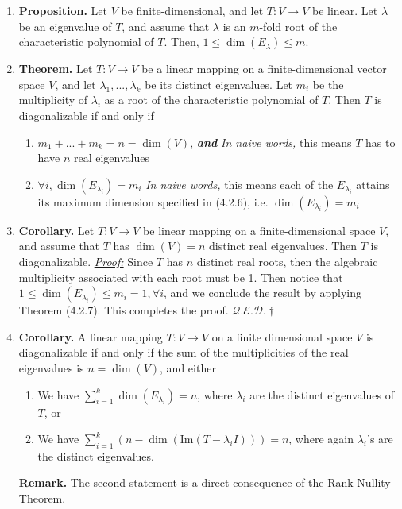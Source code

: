 \documentclass[oneside, 12pt]{book}
\newcommand{\settag}[1]{\renewcommand{\theenumi}{#1}}
\newcommand{\qed}{\hfill $\mathcal{Q}.\mathcal{E}.\mathcal{D}.\dagger$}
\newcommand{\tbf}[1]{\textbf{#1}}
\newcommand{\tit}[1]{\textit{#1}}
\newcommand{\proof}{\tit{\underline{Proof:}}} %
\newcommand{\trans}[3]{$#1:#2\rightarrow{}#3$}
\newcommand{\para}[1]{\item \tbf{#1}}
\begin{document}
\begin{enumerate}
    \settag{4.2.6}
    \para{Proposition.} Let $V$ be finite-dimensional, and let \trans{T}{V}{V} be linear. Let $\lambda$ be an eigenvalue of $T$, and assume that $\lambda$ is an $m$-fold root of the characteristic polynomial of $T$. Then, $1\leq \dim(E_\lambda) \leq m$.
    
    \settag{4.2.7}
    \para{Theorem.} Let \trans{T}{V}{V} be a linear mapping on a finite-dimensional vector space $V$, and let $\lambda_1,...,\lambda_k$ be its distinct eigenvalues. Let $m_i$ be the multiplicity of $\lambda_i$ as a root of the characteristic polynomial of $T$. Then $T$ is diagonalizable if and only if
    \begin{enumerate}
        \item $m_1+...+m_k = n = \dim(V)$, \tit{\tbf{and}} \newline
        \tit{In naive words, }this means $T$ has to have $n$ real eigenvalues
        \item $\forall i, \dim(E_{\lambda_i}) = m_i$ \newline
        \tit{In naive words, }this means each of the $E_{\lambda_i}$ attains its maximum dimension specified in (4.2.6), i.e. $\dim(E_{\lambda_i}) = m_i$
    \end{enumerate}
    
    \settag{4.2.8}
    \para{Corollary.} Let \trans{T}{V}{V} be linear mapping on a finite-dimensional space $V$, and assume that $T$ has $\dim(V) = n$ distinct real eigenvalues. Then $T$ is diagonalizable. \newline
    \proof \newline
    Since $T$ has $n$ distinct real roots, then the algebraic multiplicity associated with each root must be 1. Then notice that $1\leq \dim(E_{\lambda_i}) \leq m_i = 1, \forall i$, and we conclude the result by applying Theorem (4.2.7). This completes the proof. \qed
    
    \settag{4.2.9}
    \para{Corollary.} A linear mapping \trans{T}{V}{V} on a finite dimensional space $V$ is diagonalizable if and only if the sum of the multiplicities of the real eigenvalues is $n = \dim(V)$, and either
    \begin{enumerate}
        \item We have $\sum_{i=1}^k \dim(E_{\lambda_i}) = n$, where $\lambda_i$ are the distinct eigenvalues of $T$, or
        \item We have $\sum_{i=1}^k (n - \dim(\text{Im}(T-\lambda_i I))) = n$, where again $\lambda_i$'s are the distinct eigenvalues.
    \end{enumerate}
    \tbf{Remark.} The second statement is a direct consequence of the Rank-Nullity Theorem.
\end{enumerate}
\end{document}

